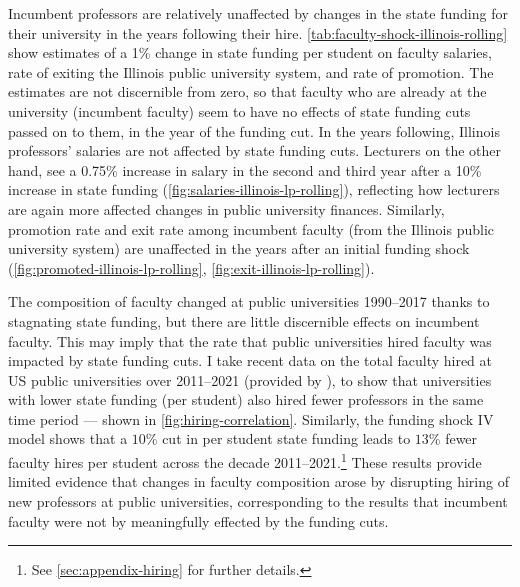 Incumbent professors are relatively unaffected by changes in the state funding for their university in the years following their hire.
\autoref{tab:faculty-shock-illinois-rolling} show estimates of a 1\% change in state funding per student on faculty salaries, rate of exiting the Illinois public university system, and rate of promotion.
The estimates are not discernible from zero, so that faculty who are already at the university (incumbent faculty) seem to have no effects of state funding cuts passed on to them, in the year of the funding cut.
In the years following, Illinois professors' salaries are not affected by state funding cuts.
Lecturers on the other hand, see a 0.75\% increase in salary in the second and third year after a 10\% increase in state funding (\autoref{fig:salaries-illinois-lp-rolling}), reflecting how lecturers are again more affected changes in public university finances.
Similarly, promotion rate and exit rate among incumbent faculty  (from the Illinois public university system) are unaffected in the years after an initial funding shock (\autoref{fig:promoted-illinois-lp-rolling}, \ref{fig:exit-illinois-lp-rolling}).


The composition of faculty changed at public universities 1990--2017 thanks to stagnating state funding, but there are little discernible effects on incumbent faculty.
This may imply that the rate that public universities hired faculty was impacted by state funding cuts.
I take recent data on the total faculty hired at US public universities over 2011--2021 (provided by \citealt{wapman2022quantifying}), to show that universities with lower state funding (per student) also hired fewer professors in the same time period --- shown in \autoref{fig:hiring-correlation}.
Similarly, the funding shock IV model shows that a $10$\% cut in per student state funding leads to $13$\% fewer faculty hires per student across the decade 2011--2021.\footnote{
    See \autoref{sec:appendix-hiring} for further details.
}
These results provide limited evidence that changes in faculty composition arose by disrupting hiring of new professors at public universities, corresponding to the results that incumbent faculty were not by meaningfully effected by the funding cuts.
